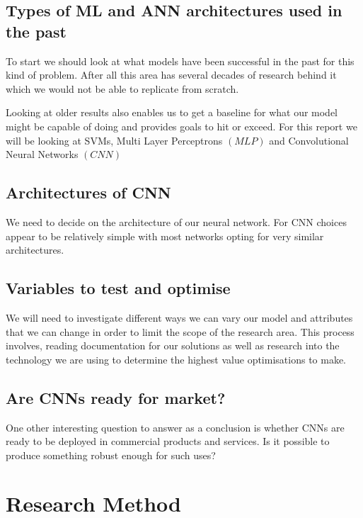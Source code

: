 \subsection{Types of ML and ANN architectures used in the past}
To start we should look at what models have been successful in the past for this kind of problem. After all this area has several decades of research behind it which we would not be able to replicate from scratch.

Looking at older results also enables us to get a baseline for what our model might be capable of doing and provides goals to hit or exceed. For this report we will be looking at SVMs, Multi Layer Perceptrons $\left(MLP\right)$ and Convolutional Neural Networks $\left(CNN\right)$

\subsection{Architectures of CNN}
We need to decide on the architecture of our neural network. For CNN choices appear to be relatively simple with most networks opting for very similar architectures.

\subsection{Variables to test and optimise}
We will need to investigate different ways we can vary our model and attributes that we can change in order to limit the scope of the research area. This process involves, reading documentation for our solutions as well as research into the technology we are using to determine the highest value optimisations to make.

\subsection{Are CNNs ready for market?}
One other interesting question to answer as a conclusion is whether CNNs are ready to be deployed in commercial products and services. Is it possible to produce something robust enough for such uses?

\section{Research Method}
